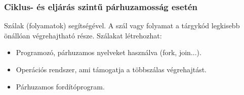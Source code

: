 \subsubsection{Ciklus- és eljárás szintű párhuzamosság esetén}
Szálak (folyamatok) segítségével.
A szál vagy folyamat a tárgykód legkisebb önállóan végrehajtható része.
Szálakat létrehozhat:
\begin{itemize}
    \item Programozó, párhuzamos nyelveket használva (fork, join...).
    \item Operációs rendszer, ami támogatja a többszálas végrehajtást.
    \item Párhuzamos fordítóprogram.
\end{itemize}
